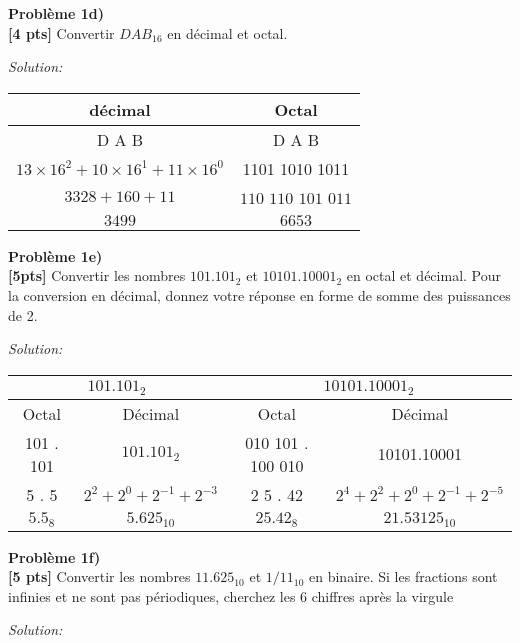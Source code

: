 \documentclass{article}
\newenvironment{problem}[2][Problème]
    { \begin{mdframed}[backgroundcolor=gray!20] \textbf{#1 #2} \\}
    {  \end{mdframed}}
\newenvironment{solution}
    {\textit{Solution:}}
    {}
\begin{document}
\begin{problem}{1d)}
\textbf{[4 pts]} Convertir $DAB_{16}$ en décimal et octal.
\end{problem}
\begin{solution}
    \begin{tabular}{c|c}
        décimal & Octal\\
        \hline
        D \hspace{40pt}A\hspace{40pt} B & D\hspace{15pt} A\hspace{15pt} B\\
        $13\times16^2 + 10\times16^1 + 11\times16^0$ & 1101 1010 1011\\
        $3328+160+11$ & $110$ $110$ $101$ $011$\\
        $3499$ & $6653$
        
    \end{tabular}
\end{solution}

\begin{problem}{1e)}
\textbf{[5pts]} Convertir les nombres $101.101_2$ et $10101.10001_2$ en octal et décimal. Pour la conversion en décimal, donnez votre réponse en forme de somme des puissances de 2.
\end{problem}
\begin{solution}
    \begin{tabular}{|c|c|c|c|}
        \hline
        \multicolumn{2}{|c|}{\large $101.101_2$} & \multicolumn{2}{|c|}{\large $10101.10001_2$}\\
        \hline
        Octal & Décimal & Octal & Décimal\\
        \hline
        101 . 101 & $101.101_2$ & 010 101 . 100 010 & 10101.10001 \\
        5  .  5 & $2^2+2^0+2^{-1}+2^{-3}$ & 2 \hspace{12pt}5 . 4\hspace{12pt}2 & $2^4+2^2+2^0+2^{-1}+2^{-5}$  \\
        $5.5_8$&$5.625_{10}$&$25.42_8$&$21.53125_{10}$\\
        \hline
    \end{tabular}
\end{solution}

\begin{problem}{1f)}
\textbf{[5 pts]} Convertir les nombres $11.625_{10}$ et $1/11_{10}$ en binaire. Si les fractions sont infinies et ne sont pas périodiques, cherchez les 6 chiffres après la virgule
\end{problem}
\begin{solution}
\end{solution}
\end{document}
